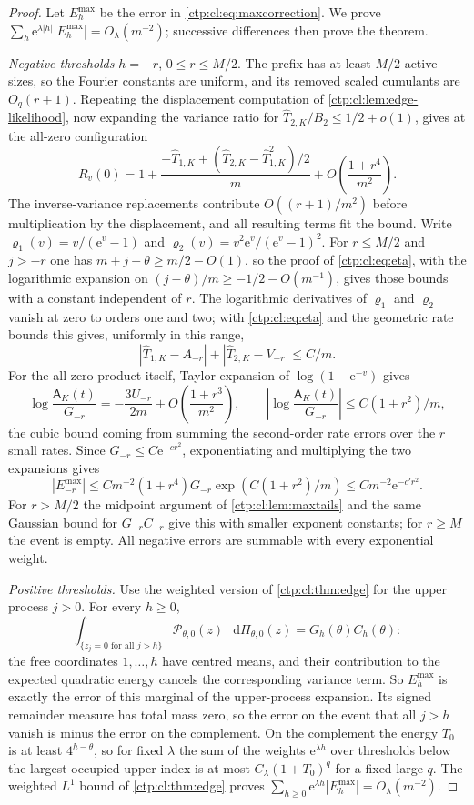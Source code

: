 \documentclass[11pt,a4paper]{article}
\numberwithin{equation}{section}
\theoremstyle{definition}
\theoremstyle{remark}
\newcommand{\e}{\mathrm e}
\newcommand{\dd}{\mathop{}\!\mathrm d}
\newcommand{\amp}{\mathsf A}
\begin{document}
\begin{proof}
Let $E^{\max}_h$ be the error in \eqref{ctp:cl:eq:maxcorrection}. We prove
$\sum_h\e^{\lambda|h|}|E^{\max}_h|=O_\lambda(m^{-2})$; successive differences
then prove the theorem.

\emph{Negative thresholds} $h=-r$, $0\le r\le M/2$. The prefix has at least
$M/2$ active sizes, so the Fourier constants are uniform, and its removed
scaled cumulants are $O_q(r+1)$. Repeating the displacement computation of
\cref{ctp:cl:lem:edge-likelihood}, now expanding the variance ratio for
$\widehat T_{2,K}/B_2\le1/2+o(1)$, gives at the all-zero configuration
\[
 R_v(0)=1+\frac{-\widehat T_{1,K}+(\widehat T_{2,K}-\widehat T_{1,K}^2)/2}m
 +O\!\left(\frac{1+r^4}{m^2}\right).
\]
The inverse-variance replacements contribute $O((r+1)/m^2)$ before
multiplication by the displacement, and all resulting terms fit the bound.
Write $\varrho_1(v)=v/(\e^v-1)$ and $\varrho_2(v)=v^2\e^v/(\e^v-1)^2$. For
$r\le M/2$ and $j>-r$ one has $m+j-\theta\ge m/2-O(1)$, so the proof of
\eqref{ctp:cl:eq:eta}, with the logarithmic expansion on
$(j-\theta)/m\ge-1/2-O(m^{-1})$, gives those bounds with a constant
independent of $r$. The logarithmic derivatives of $\varrho_1$ and
$\varrho_2$ vanish at zero to orders one and two; with \eqref{ctp:cl:eq:eta}
and the geometric rate bounds this gives, uniformly in this range,
\[
 |\widehat T_{1,K}-A_{-r}|+|\widehat T_{2,K}-V_{-r}|\le C/m.
\]
For the all-zero product itself, Taylor expansion of $\log(1-\e^{-v})$ gives
\[
 \log\frac{\amp_K(t)}{G_{-r}}=-\frac{3U_{-r}}{2m}+O\!\left(\frac{1+r^3}{m^2}\right),
 \qquad\left|\log\frac{\amp_K(t)}{G_{-r}}\right|\le C(1+r^2)/m,
\]
the cubic bound coming from summing the second-order rate errors over the
$r$ small rates. Since $G_{-r}\le C\e^{-cr^2}$, exponentiating and
multiplying the two expansions gives
\[
 |E^{\max}_{-r}|\le Cm^{-2}(1+r^4)G_{-r}\exp(C(1+r^2)/m)\le Cm^{-2}\e^{-c'r^2}.
\]
For $r>M/2$ the midpoint argument of \cref{ctp:cl:lem:maxtails} and the same
Gaussian bound for $G_{-r}C_{-r}$ give this with smaller exponent constants;
for $r\ge M$ the event is empty. All negative errors are summable with every
exponential weight.

\emph{Positive thresholds.} Use the weighted version of
\cref{ctp:cl:thm:edge} for the upper process $j>0$. For every $h\ge0$,
\[
 \int_{\{z_j=0\text{ for all }j>h\}}\mathcal P_{\theta,0}(z)\,\dd\Pi_{\theta,0}(z)
 =G_h(\theta)C_h(\theta):
\]
the free coordinates $1,\ldots,h$ have centred means, and their
contribution to the expected quadratic energy cancels the corresponding
variance term. So $E^{\max}_h$ is exactly the error of this marginal of the
upper-process expansion. Its signed remainder measure has total mass zero,
so the error on the event that all $j>h$ vanish is minus the error on the
complement. On the complement the energy $T_0$ is at least $4^{h-\theta}$,
so for fixed $\lambda$ the sum of the weights $\e^{\lambda h}$ over
thresholds below the largest occupied upper index is at most
$C_\lambda(1+T_0)^q$ for a fixed large $q$. The weighted $L^1$ bound of
\cref{ctp:cl:thm:edge} proves $\sum_{h\ge0}\e^{\lambda h}|E^{\max}_h|=O_\lambda(m^{-2})$.
\end{proof}
\end{document}
